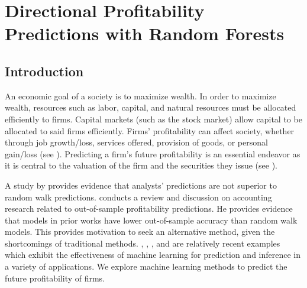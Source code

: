\chapter{Directional Profitability Predictions with Random Forests} \label{Chapter:ABIS}

\section{Introduction}


An economic goal of a society is to maximize wealth. In order to maximize wealth, resources such as labor, capital, and natural resources must be allocated efficiently to firms. Capital markets (such as the stock market) allow capital to be allocated to said firms efficiently. Firms' profitability can affect society, whether through job growth/loss, services offered, provision of goods, or personal gain/loss (see \cite{IntAccBook}).  Predicting a firm's future profitability is an essential endeavor as it is central to the valuation of the firm and the securities they issue (see \cite{Monahan}). 

A study by \cite{Bradshaw} provides evidence that analysts' predictions are not superior to random walk predictions. \cite{Monahan} conducts a review and discussion on accounting research related to out-of-sample profitability predictions.  He provides evidence that models in prior works have lower out-of-sample accuracy than random walk models. This provides motivation to seek an alternative method, given the shortcomings of traditional methods.   \cite{ABIS:ML:EX1},  \cite{ABIS:ML:EX2},  \cite{ABIS:ML:EX3},  and \cite{ABIS:ML:EX4} are relatively recent examples which exhibit the effectiveness of machine learning for prediction and inference in a variety of applications.  We explore machine learning methods to predict the future profitability of firms.
 
